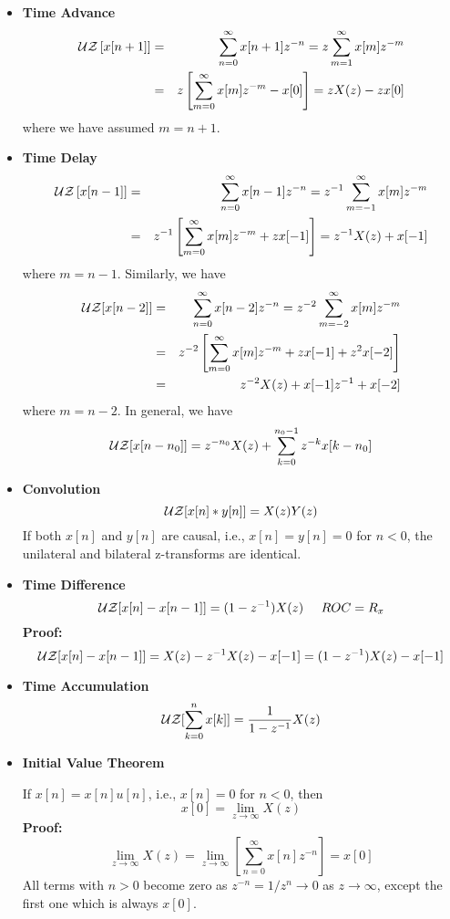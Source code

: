 \begin{itemize}
\item {\bf Time Advance}
\begin{eqnarray}
  {\cal UZ}\left[x[n+1]\right]&=&\sum_{n=0}^\infty x[n+1]z^{-n}
  =z\sum_{m=1}^\infty x[m]z^{-m}
  \nonumber \\
  &=&z\left[\sum_{m=0}^\infty x[m]z^{-m}-x[0]\right]=zX(z)-zx[0] 
  \nonumber \end{eqnarray}
where we have assumed $m=n+1$.

\item {\bf Time Delay}
\begin{eqnarray}
  {\cal UZ}\left[x[n-1]\right]&=&\sum_{n=0}^\infty x[n-1]z^{-n}
  =z^{-1}\sum_{m=-1}^\infty x[m]z^{-m}
  \nonumber \\
  &=& z^{-1}\left[ \sum_{m=0}^\infty x[m]z^{-m}+zx[-1]\right]=z^{-1}X(z)+x[-1]
  \nonumber
\end{eqnarray}
where $m=n-1$. Similarly, we have
\begin{eqnarray}
  {\cal UZ}[x[n-2]] &=& \sum_{n=0}^\infty x[n-2]z^{-n}
  =z^{-2}\sum_{m=-2}^\infty x[m]z^{-m}
  \nonumber \\
  &=& z^{-2}\left[\sum_{m=0}^\infty x[m]z^{-m}+zx[-1]+z^2 x[-2]\right]
  \nonumber \\
  &=&z^{-2}X(z)+x[-1]z^{-1}+x[-2]
  \nonumber
\end{eqnarray}
where $m=n-2$. In general, we have
\[ {\cal UZ}[x[n-n_0]] = z^{-n_0}X(z)+\sum_{k=0}^{n_0-1} z^{-k} x[k-n_0] \]

\item {\bf Convolution}
\[	{\cal UZ}[x[n]*y[n]]=X(z)Y(z)	\]
If both $x[n]$ and $y[n]$ are causal, i.e., $x[n]=y[n]=0$ for $n<0$, the
unilateral and bilateral z-transforms are identical.

\item {\bf Time Difference}
\[	{\cal UZ}[x[n]-x[n-1]]=(1-z^{-1})X(z) \;\;\;\;\;ROC=R_x  	\]
{\bf Proof: } 
\[	
{\cal UZ}[x[n]-x[n-1]]=X(z)-z^{-1}X(z)-x[-1]=(1-z^{-1})X(z)-x[-1]
\]

\item {\bf Time Accumulation}
\[	{\cal UZ}[\sum_{k=0}^nx[k]]=\frac{1}{1-z^{-1}}X(z)	\]

\item {\bf Initial Value Theorem}

If $x[n]=x[n]u[n]$, i.e., $x[n]=0$ for $n<0$, then
\[	x[0]=\lim_{z\rightarrow \infty} X(z)	\]
{\bf Proof: }
\[	\lim_{z\rightarrow \infty} X(z)=\lim_{z\rightarrow \infty} 
	\left[\sum_{n=0}^\infty x[n]z^{-n}\right]=x[0]
\]
All terms with $n>0$ become zero as $z^{-n}=1/z^n \rightarrow 0$ as 
$z \rightarrow \infty$, except the first one which is always $x[0]$.


\end{itemize}
